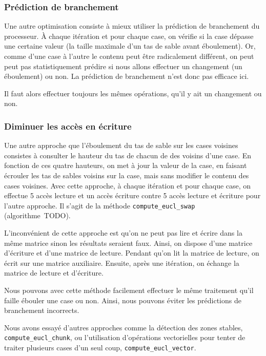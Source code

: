 \subsubsection{Prédiction de branchement}

Une autre optimisation consiste à mieux utiliser la prédiction de
branchement du processeur. À chaque itération et pour chaque case, on
vérifie si la case dépasse une certaine valeur (la taille maximale
d'un tas de sable avant éboulement). Or, comme d'une case à l'autre le
contenu peut être radicalement différent, on peut peut pas
statistiquement prédire si nous allons effectuer un changement (un
éboulement) ou non. La prédiction de branchement n'est donc pas
efficace ici.
\medskip

Il faut alors effectuer toujours les mêmes opérations, qu'il y ait
un changement ou non.
\medskip


\subsubsection{Diminuer les accès en écriture}

Une autre approche que l'éboulement du tas de sable sur les cases
voisines consistes à consulter le hauteur du tas de chacun de des
voisins d'une case. En fonction de ces quatre hauteurs, on met à jour
la valeur de la case, en faisant écrouler les tas de sables voisins
sur la case, mais sans modifier le contenu des cases voisines. Avec
cette approche, à chaque itération et pour chaque case, on effectue 5
accès lecture et un accès écriture contre 5 accès lecture et écriture
pour l'autre approche. Il s'agit de la méthode
\texttt{compute\_eucl\_swap} (algorithme~TODO).
\medskip

L'inconvénient de cette approche est qu'on ne peut pas lire et écrire
dans la même matrice sinon les résultats seraient faux. Ainsi, on
dispose d'une matrice d'écriture et d'une matrice de lecture. Pendant
qu'on lit la matrice de lecture, on écrit sur une matrice
auxiliaire. Ensuite, après une itération, on échange la matrice de
lecture et d'écriture.
\medskip

Nous pouvons avec cette méthode facilement effectuer le même
traitement qu'il faille ébouler une case ou non. Ainsi, nous pouvons
éviter les prédictions de branchement incorrects.
\bigskip

Nous avons essayé d'autres approches comme la détection des zones
stables, \texttt{compute\_\-eucl\_\-chunk}, ou l'utilisation
d'opérations vectorielles pour tenter de traiter plusieurs cases d'un
seul coup, \texttt{compute\_\-eucl\_\-vector}.
\medskip

